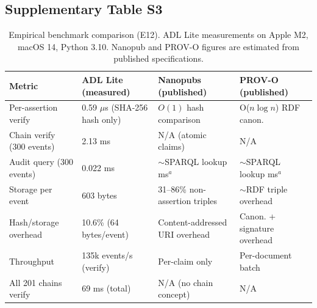 \subsection{Supplementary Table S3}\label{tab:S3}
\begin{table}[htbp]
\centering
\small
\caption{Empirical benchmark comparison (E12). ADL Lite measurements on Apple M2, macOS 14, Python 3.10. Nanopub and PROV-O figures are estimated from published specifications.}
\label{tab:comparative-benchmark}
\begin{tabularx}{\textwidth}{@{}p{3.2cm}XXX@{}}
\toprule
\textbf{Metric} & \textbf{ADL Lite (measured)} & \textbf{Nanopubs (published)} & \textbf{PROV-O (published)} \\
\midrule
Per-assertion verify & 0.59 $\mu$s (SHA-256 hash only) & $O(1)$ hash comparison \cite{trusty_uris} & O($n\log n$) RDF canon.~\cite{w3c_rdf_canon} \\
Chain verify (300 events) & 2.13 ms & N/A (atomic claims) & N/A \\
Audit query (300 events) & 0.022 ms & $\sim$SPARQL lookup ms$^a$ & $\sim$SPARQL lookup ms$^a$ \\
Storage per event & 603 bytes & 31--86\% non-assertion triples \cite{nanopublications} & $\sim$RDF triple overhead \\
Hash/storage overhead & 10.6\% (64 bytes/event) & Content-addressed URI overhead & Canon. + signature overhead \\
Throughput & 135k events/s (verify) & Per-claim only & Per-document batch \\
All 201 chains verify & 69 ms (total) & N/A (no chain concept) & N/A \\
\bottomrule
\end{tabularx}
\end{table}

